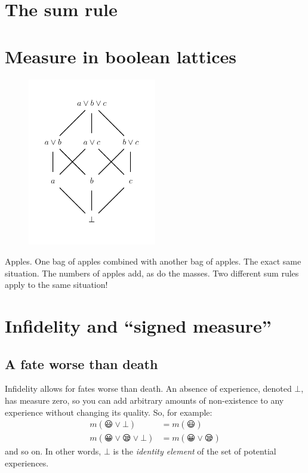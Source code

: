 \documentclass[a4paper, 12pt]{article}
\begin{document}
\section{The sum rule}

\section{Measure in boolean lattices}


\begin{figure}[!ht]
\centering
\includegraphics[width=0.5\textwidth]{figures/boolean_lattice.pdf}
\caption{\label{fig:boolean_lattice}}
\end{figure}


Apples.
One bag of apples combined with another bag of apples.
The exact same situation. The numbers of apples add, as
do the masses. Two different sum rules apply to the same
situation!


\section{Infidelity and ``signed measure''}

\subsection{A fate worse than death}

Infidelity allows for fates worse than death.
An absence of experience, denoted $\bot$,
has measure zero, so you can add arbitrary amounts
of non-existence to any experience without changing
its quality. So, for example:
\begin{align}
m(😃 \vee \bot)        &= m(😃)\\
m(😀 \vee 😪 \vee \bot) &= m(😀 \vee 😪)
\end{align}
and so on.
In other words, $\bot$ is the {\em identity element}
of the set of potential experiences.



\end{document}

